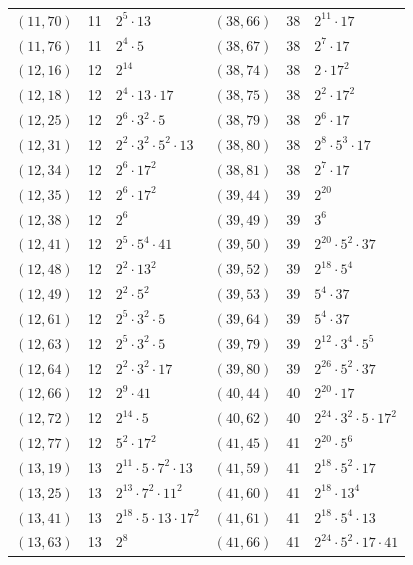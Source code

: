 \documentclass[11pt]{article}
\begin{document}
\begin{longtable}{@{}lrl@{\qquad}lrl@{}}
$(11,70)$ & 11 & $2^{5}\cdot 13$ & $(38,66)$ & 38 & $2^{11}\cdot 17$\\
$(11,76)$ & 11 & $2^{4}\cdot 5$ & $(38,67)$ & 38 & $2^{7}\cdot 17$\\
$(12,16)$ & 12 & $2^{14}$ & $(38,74)$ & 38 & $2\cdot 17^{2}$\\
$(12,18)$ & 12 & $2^{4}\cdot 13\cdot 17$ & $(38,75)$ & 38 & $2^{2}\cdot 17^{2}$\\
$(12,25)$ & 12 & $2^{6}\cdot 3^{2}\cdot 5$ & $(38,79)$ & 38 & $2^{6}\cdot 17$\\
$(12,31)$ & 12 & $2^{2}\cdot 3^{2}\cdot 5^{2}\cdot 13$ & $(38,80)$ & 38 & $2^{8}\cdot 5^{3}\cdot 17$\\
$(12,34)$ & 12 & $2^{6}\cdot 17^{2}$ & $(38,81)$ & 38 & $2^{7}\cdot 17$\\
$(12,35)$ & 12 & $2^{6}\cdot 17^{2}$ & $(39,44)$ & 39 & $2^{20}$\\
$(12,38)$ & 12 & $2^{6}$ & $(39,49)$ & 39 & $3^{6}$\\
$(12,41)$ & 12 & $2^{5}\cdot 5^{4}\cdot 41$ & $(39,50)$ & 39 & $2^{20}\cdot 5^{2}\cdot 37$\\
$(12,48)$ & 12 & $2^{2}\cdot 13^{2}$ & $(39,52)$ & 39 & $2^{18}\cdot 5^{4}$\\
$(12,49)$ & 12 & $2^{2}\cdot 5^{2}$ & $(39,53)$ & 39 & $5^{4}\cdot 37$\\
$(12,61)$ & 12 & $2^{5}\cdot 3^{2}\cdot 5$ & $(39,64)$ & 39 & $5^{4}\cdot 37$\\
$(12,63)$ & 12 & $2^{5}\cdot 3^{2}\cdot 5$ & $(39,79)$ & 39 & $2^{12}\cdot 3^{4}\cdot 5^{5}$\\
$(12,64)$ & 12 & $2^{2}\cdot 3^{2}\cdot 17$ & $(39,80)$ & 39 & $2^{26}\cdot 5^{2}\cdot 37$\\
$(12,66)$ & 12 & $2^{9}\cdot 41$ & $(40,44)$ & 40 & $2^{20}\cdot 17$\\
$(12,72)$ & 12 & $2^{14}\cdot 5$ & $(40,62)$ & 40 & $2^{24}\cdot 3^{2}\cdot 5\cdot 17^{2}$\\
$(12,77)$ & 12 & $5^{2}\cdot 17^{2}$ & $(41,45)$ & 41 & $2^{20}\cdot 5^{6}$\\
$(13,19)$ & 13 & $2^{11}\cdot 5\cdot 7^{2}\cdot 13$ & $(41,59)$ & 41 & $2^{18}\cdot 5^{2}\cdot 17$\\
$(13,25)$ & 13 & $2^{13}\cdot 7^{2}\cdot 11^{2}$ & $(41,60)$ & 41 & $2^{18}\cdot 13^{4}$\\
$(13,41)$ & 13 & $2^{18}\cdot 5\cdot 13\cdot 17^{2}$ & $(41,61)$ & 41 & $2^{18}\cdot 5^{4}\cdot 13$\\
$(13,63)$ & 13 & $2^{8}$ & $(41,66)$ & 41 & $2^{24}\cdot 5^{2}\cdot 17\cdot 41$\\

\end{longtable}
\end{document}
